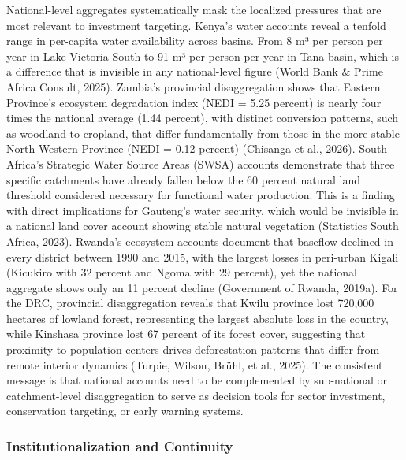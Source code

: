 \documentclass[
  letterpaper,
  DIV=11,
  numbers=noendperiod]{scrartcl}
\begin{document}
National-level aggregates systematically mask the localized pressures
that are most relevant to investment targeting. Kenya's water accounts
reveal a tenfold range in per-capita water availability across basins.
From 8 m³ per person per year in Lake Victoria South to 91 m³ per person
per year in Tana basin, which is a difference that is invisible in any
national-level figure (World Bank \& Prime Africa Consult, 2025).
Zambia's provincial disaggregation shows that Eastern Province's
ecosystem degradation index (NEDI = 5.25 percent) is nearly four times
the national average (1.44 percent), with distinct conversion patterns,
such as woodland-to-cropland, that differ fundamentally from those in
the more stable North-Western Province (NEDI = 0.12 percent) (Chisanga
et al., 2026). South Africa's Strategic Water Source Areas (SWSA)
accounts demonstrate that three specific catchments have already fallen
below the 60 percent natural land threshold considered necessary for
functional water production. This is a finding with direct implications
for Gauteng's water security, which would be invisible in a national
land cover account showing stable natural vegetation (Statistics South
Africa, 2023). Rwanda's ecosystem accounts document that baseflow
declined in every district between 1990 and 2015, with the largest
losses in peri-urban Kigali (Kicukiro with 32 percent and Ngoma with 29
percent), yet the national aggregate shows only an 11 percent decline
(Government of Rwanda, 2019a). For the DRC, provincial disaggregation
reveals that Kwilu province lost 720,000 hectares of lowland forest,
representing the largest absolute loss in the country, while Kinshasa
province lost 67 percent of its forest cover, suggesting that proximity
to population centers drives deforestation patterns that differ from
remote interior dynamics (Turpie, Wilson, Brühl, et al., 2025). The
consistent message is that national accounts need to be complemented by
sub-national or catchment-level disaggregation to serve as decision
tools for sector investment, conservation targeting, or early warning
systems.

\subsubsection{Institutionalization and
Continuity}\label{institutionalization-and-continuity}
\end{document}
